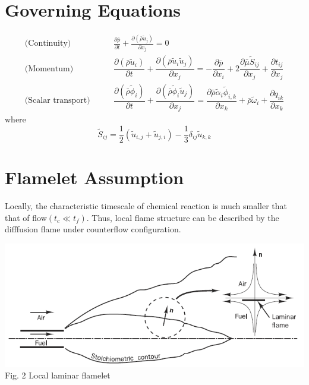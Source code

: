 \documentclass[a0,portrait]{a0poster}
\begin{document}
\begin{multicols}{2}
\section*{Governing Equations}
	\color{DarkSlateGray}
    \begin{align}
      \mbox{(Continuity)}\qquad & \frac{\partial \bar{\rho}}{\partial t} + \frac{\partial (\bar{\rho}\tilde{u}_j)}{\partial x_j}=0\\
      \mbox{(Momentum)}\qquad & \dfrac{\partial(\bar{\rho}\tilde{u}_i)}{\partial t} + \dfrac{\partial (\bar{\rho}\tilde{u}_i\tilde{u}_j)}{\partial x_j} = -\dfrac{\partial \bar{p}}{\partial x_i} + 2\dfrac{\partial \bar{\mu}\tilde{S}_{ij}}{\partial x_j} + \dfrac{\partial t_{ij
      }}{\partial x_j}\label{NS}\\
      \mbox{(Scalar transport)}\qquad & \dfrac{\partial(\bar{\rho}\tilde{\phi}_i)}{\partial t} + \dfrac{\partial (\bar{\rho}\tilde{\phi}_i\tilde{u}_j)}{\partial x_j} = \dfrac{\partial \bar{\rho}\tilde{\alpha}_{i}\tilde{\phi}_{i, k}}{\partial x_k} + \bar{\rho}\tilde{\omega}_i + \dfrac{\partial q_{ik
      }}{\partial x_k}
    \end{align}
	where
	\[\tilde{S}_{ij} = \frac{1}{2}(\tilde{u}_{i,j} + \tilde{u}_{j, i}) - \frac{1}{3}\delta_{ij}\tilde{u}_{k,k}\]
	
\color{SaddleBrown}
\section*{Flamelet Assumption}
	\color{DarkSlateGray}
	Locally, the characteristic timescale of chemical reaction is much smaller that that of flow$(t_c \ll t_f)$.\newline
	Thus, local flame structure can be described by the difffusion flame under counterflow configuration.
	\vspace{0.5cm}
	\begin{center}
		\vspace{-0.5cm}
		\includegraphics[width=0.85\linewidth]{pic/flamelet.png}\\
		\vspace{-0.25cm}
		{\color{Green} Fig. 2 Local laminar flamelet}
	\end{center}



\end{multicols}
\end{document}

